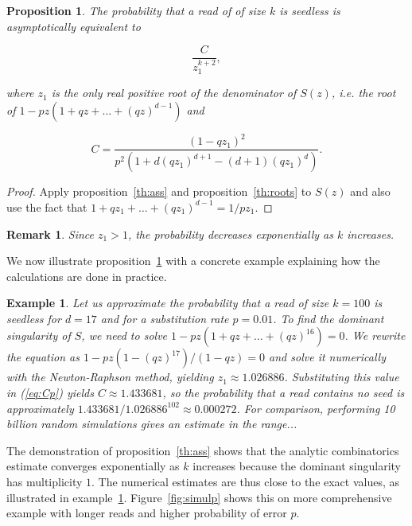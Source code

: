 \documentclass{article}
\newtheorem{example}{Example}
\newtheorem{proposition}{Proposition}
\newtheorem{remark}{Remark}
\begin{document}
\begin{proposition}
\label{th:p}
The probability that a read of of size $k$ is seedless is
asymptotically equivalent to

\begin{equation*}
\frac{C}{z_1^{k+2}},
\end{equation*}

\noindent
where $z_1$ is the only real positive root of the denominator of $S(z)$,
\textit{i.e.} the root of $1-pz(1+qz+\ldots+(qz)^{d-1})$ and

\begin{equation}
\label{eq:Cp}
C =\frac{(1-qz_1)^2}{p^2\left( 1 + d(qz_1)^{d+1} - (d+1)(qz_1)^d
\right)}.
\end{equation}

\end{proposition}

\begin{proof}
Apply proposition~\ref{th:ass} and proposition~\ref{th:roots} to $S(z)$
and also use the fact that $1+qz_1+\ldots+(qz_1)^{d-1} = 1/pz_1$.
\end{proof}

\begin{remark}
Since $z_1 > 1$, the probability decreases exponentially
as $k$ increases.
\end{remark}

We now illustrate proposition~\ref{th:p} with a concrete example
explaining how the calculations are done in practice.

\begin{example}
\label{ex:num}
Let us approximate the probability that a read of size $k=100$ is seedless
for $d=17$ and for a substitution rate $p=0.01$. To find the dominant
singularity of $S$, we need to solve $1-pz(1+qz+\ldots+(qz)^{16}) = 0$.
We rewrite the equation as $1-pz(1-(qz)^{17})/(1-qz) = 0$ and solve it
numerically with the Newton-Raphson method, yielding $z_1 \approx
1.026886$. Substituting this value in (\ref{eq:Cp}) yields $C \approx
1.433681$, so the probability that a read contains no seed is
approximately $1.433681 / 1.026886^{102} \approx 0.000272$. 
For comparison, performing 10 billion random simulations gives an
estimate in the range...
\end{example}

The demonstration of proposition~\ref{th:ass} shows that the analytic
combinatorics estimate converges exponentially as $k$ increases because
the dominant singularity has multiplicity $1$. The numerical estimates are
thus close to the exact values, as illustrated in example~\ref{ex:num}.
Figure~\ref{fig:simulp} shows this on more comprehensive example
with longer reads and higher probability of error $p$.
\end{document}
